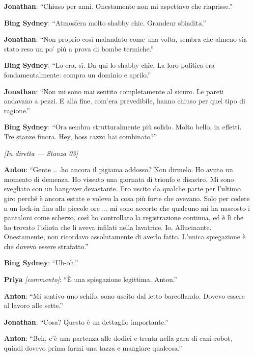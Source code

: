 \noindent\textbf{Jonathan}: ``Chiuso per anni. Onestamente non mi aspettavo che riaprisse.''

\noindent\textbf{Bing Sydney}: ``Atmosfera molto shabby chic. Grandeur sbiadita.''

\noindent\textbf{Jonathan}: ``Non proprio così malandato come una volta, sembra che almeno sia stato reso un po' più a prova di bombe termiche.''

\noindent\textbf{Bing Sydney}: ``Lo era, sì. Da qui lo shabby chic. La loro politica era fondamentalmente: compra un dominio e aprilo.''

\noindent\textbf{Jonathan}: ``Non mi sono mai sentito completamente al sicuro. Le pareti andavano a pezzi. E alla fine, com'era prevedibile, hanno chiuso per quel tipo di ragione.''

\noindent\textbf{Bing Sydney}: ``Ora sembra strutturalmente più solido. Molto bello, in effetti. Tre stanze finora. Hey, boss cazzo hai combinato?''

\medskip
\begin{center}
{\small\sffamily\color{nullmesh-ghost}\textit{[In diretta --- Stanza 03]}}
\end{center}
\medskip

\noindent\textbf{Anton}: ``Gente .. .ho ancora il pigiama addosso? Non dirmelo. Ho avuto un momento di demenza. Ho vissuto una giornata di trionfo e disastro. Mi sono svegliato con un hangover devastante. Ero uscito da qualche parte per l'ultimo giro perché è ancora estate e volevo la cosa più forte che avevano. Solo per cedere a un lock-in fino alle piccole ore ...  mi sono accorto che qualcuno mi ha nascosto i pantaloni come scherzo, così ho controllato la registrazione continua, ed è lì che ho trovato l'idiota che li aveva infilati nella lavatrice. Io. Allucinante. Onestamente, non ricordavo assolutamente di averlo fatto. L'unica spiegazione è che dovevo essere strafatto.''

\noindent\textbf{Bing Sydney}: ``Uh-oh.''

\noindent\textbf{Priya} \textit{[commento]}: ``È una spiegazione legittima, Anton.''

\noindent\textbf{Anton}: ``Mi sentivo uno schifo, sono uscito dal letto barcollando. Dovevo essere al lavoro alle sette.''

\noindent\textbf{Jonathan}: ``Cosa? Questo è un dettaglio importante.''

\noindent\textbf{Anton}: ``Beh, c'è una partenza alle dodici e trenta nella gara di cani-robot, quindi dovevo prima farmi una tazza e mangiare qualcosa.''

